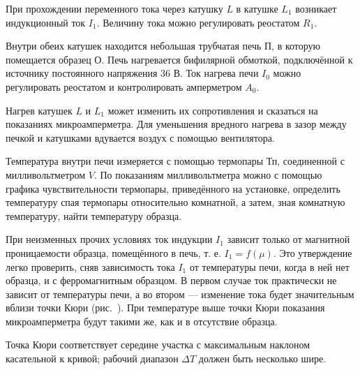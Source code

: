 При прохождении переменного тока через катушку $L$ в катушке $L_1$ возникает
индукционный ток $I_1$. Величину тока можно регулировать реостатом $R_1$.

Внутри обеих катушек находится небольшая трубчатая печь $\text{П}$, в которую
помещается образец $\text{О}$. Печь нагревается бифилярной обмоткой,
подключённой к источнику постоянного напряжения 36 В. Ток нагрева печи $I_0$
можно
регулировать реостатом и контролировать амперметром $A_0$.

Нагрев катушек $L$ и $L_1$ может изменить их сопротивления и сказаться на
показаниях микроамперметра. Для уменьшения
вредного нагрева в зазор между печкой и катушками вдувается воздух с помощью
вентилятора.

Температура внутри печи измеряется с помощью термопары $\text{Тп}$, соединенной
с милливольтметром $V$. По показаниям милливольтметра можно с помощью графика
чувствительности термопары, приведённого на установке, определить температуру
спая термопары относительно комнатной, а затем, зная комнатную температуру,
найти температуру образца.

При неизменных прочих условиях ток индукции $I_1$ зависит только от магнитной
проницаемости образца, помещённого в печь, т. е. $I_1 = f(\mu)$. Это
утверждение легко проверить, сняв зависимость тока $I_1$ от температуры печи,
когда в ней нет образца, и с ферромагнитным образцом. В первом случае ток
практически не зависит от температуры печи, а во втором --- изменение тока будет
значительным вблизи точки Кюри (рис.~). При температуре выше точки Кюри показания микроамперметра будут
такими же, как и в отсутствие образца.

Точка Кюри соответствует середине участка с максимальным наклоном касательной к
кривой; рабочий диапазон $\Delta T$ должен быть несколько шире.

